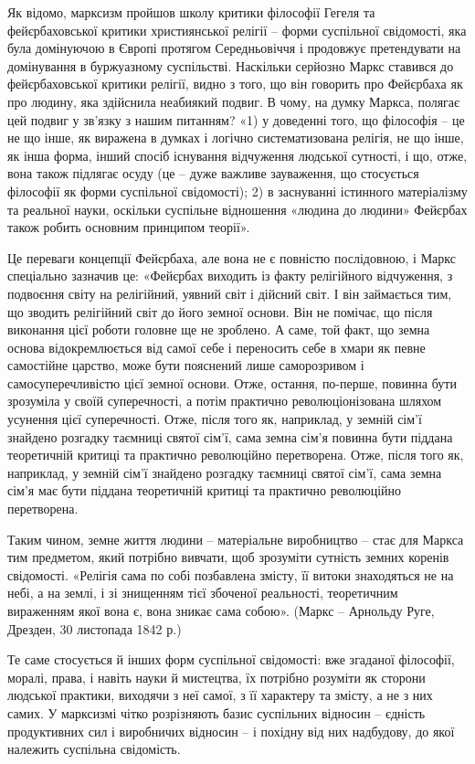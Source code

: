 \documentclass[12pt,a4paper,openany]{book}
\begin{document}
Як відомо, марксизм пройшов школу критики філософії Гегеля та фейєрбаховської критики християнської релігії – форми суспільної свідомості, яка була домінуючою в Європі протягом Середньовіччя і продовжує претендувати на домінування в буржуазному суспільстві. Наскільки серйозно Маркс ставився до фейєрбаховської критики релігії, видно з того, що він говорить про Фейєрбаха як про людину, яка здійснила неабиякий подвиг. В чому, на думку Маркса, полягає цей подвиг у зв’язку з нашим питанням? «1) у доведенні того, що філософія – це не що інше, як виражена в думках і логічно систематизована релігія, не що інше, як інша форма, інший спосіб існування відчуження людської сутності, і що, отже, вона також підлягає осуду (це – дуже важливе зауваження, що стосується філософії як форми суспільної свідомості); 2) в заснуванні істинного матеріалізму та реальної науки, оскільки суспільне відношення «людина до людини» Фейєрбах також робить основним принципом теорії».

Це переваги концепції Фейєрбаха, але вона не є повністю послідовною, і Маркс спеціально зазначив це: «Фейєрбах виходить із факту релігійного відчуження, з подвоєння світу на релігійний, уявний світ і дійсний світ. І він займається тим, що зводить релігійний світ до його земної основи. Він не помічає, що після виконання цієї роботи головне ще не зроблено. А саме, той факт, що земна основа відокремлюється від самої себе і переносить себе в хмари як певне самостійне царство, може бути пояснений лише саморозривом і самосуперечливістю цієї земної основи. Отже, остання, по-перше, повинна бути зрозуміла у своїй суперечності, а потім практично революціонізована шляхом усунення цієї суперечності. Отже, після того як, наприклад, у земній сім’ї знайдено розгадку таємниці святої сім’ї, сама земна сім’я повинна бути піддана теоретичній критиці та практично революційно перетворена. Отже, після того як, наприклад, у земній сім’ї знайдено розгадку таємниці святої сім’ї, сама земна сім’я має бути піддана теоретичній критиці та практично революційно перетворена.

Таким чином, земне життя людини – матеріальне виробництво – стає для Маркса тим предметом, який потрібно вивчати, щоб зрозуміти сутність земних коренів свідомості. «Релігія сама по собі позбавлена змісту, її витоки знаходяться не на небі, а на землі, і зі знищенням тієї збоченої реальності, теоретичним вираженням якої вона є, вона зникає сама собою». (Маркс – Арнольду Руге, Дрезден, 30 листопада 1842 р.)

Те саме стосується й інших форм суспільної свідомості: вже згаданої філософії, моралі, права, і навіть науки й мистецтва, їх потрібно розуміти як сторони людської практики, виходячи з неї самої, з її характеру та змісту, а не з них самих. У марксизмі чітко розрізняють базис суспільних відносин – єдність продуктивних сил і виробничих відносин – і похідну від них надбудову, до якої належить суспільна свідомість.
\end{document}

